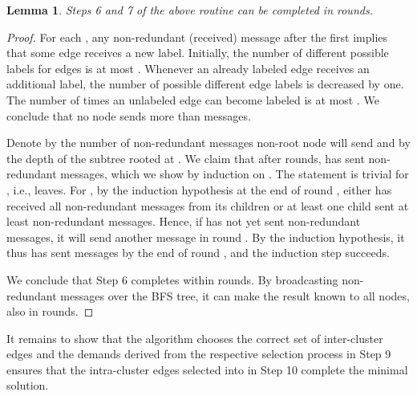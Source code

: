 \documentclass[letterpaper,11pt]{article}
\newtheorem{lemma}[theorem]{Lemma}
\begin{document}
\begin{lemma}\label{lemma:prune_6_7}
Steps 6 and 7 of the above routine can be completed in  rounds.
\end{lemma}
\begin{proof}
For each , any non-redundant (received) message
 after the first implies that some edge receives a new label.
Initially, the number of different possible labels for edges is at most .
Whenever an already labeled edge receives an additional label, the number of
possible different edge labels is decreased by one. The number of times an
unlabeled edge can become labeled is at most . We
conclude that no node sends more than  messages.

Denote by  the number of non-redundant messages non-root node  will send
and by  the depth of the subtree rooted at . We claim that after 
rounds,  has sent  non-redundant messages, which we show
by induction on . The statement is trivial for , i.e., leaves. For
, by the induction hypothesis at the end of round , either  has
received all non-redundant messages from its children or at least one child sent
at least  non-redundant messages. Hence, if  has not yet sent
 non-redundant messages, it will send another message in
round . By the induction hypothesis, it thus has sent 
messages by the end of round , and the induction step succeeds.

We conclude that Step 6 completes within  rounds. By
broadcasting  non-redundant messages over the BFS tree, it can
make the result known to all nodes, also in  rounds.
\end{proof}

It remains to show that the algorithm chooses the correct set of inter-cluster
edges and the demands derived from the respective selection process in Step 9
ensures that the intra-cluster edges selected into  in Step 10 complete the
minimal solution.
\end{document}
